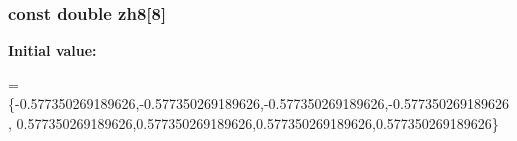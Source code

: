 \subsubsection[{zh8}]{\setlength{\rightskip}{0pt plus 5cm}const double zh8[8]}\label{GaussQuadratureHex_8cc_af7b25433ba168a626980b8a9b66c1a2e}
{\bfseries Initial value\-:}
\begin{DoxyCode}
= \{-0.577350269189626,-0.577350269189626,-0.577350269189626,-0.577350269189626,
                   0.577350269189626,0.577350269189626,0.577350269189626,0.577350269189626\}
\end{DoxyCode}
